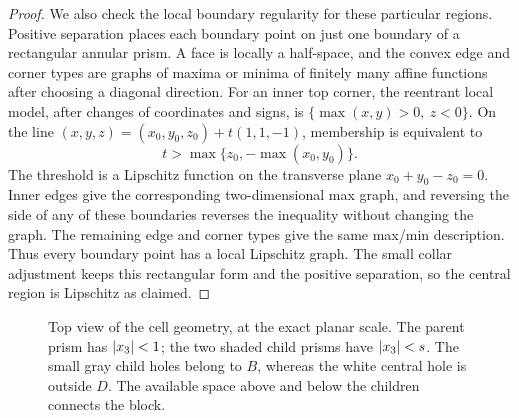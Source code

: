 \begin{proof}
We also check the local boundary regularity for these particular
regions. Positive separation places each boundary point on just one
boundary of a rectangular annular prism. A face is locally a half-space,
and the convex edge and corner types are graphs of maxima or minima of
finitely many affine functions after choosing a diagonal direction.
For an inner top corner, the reentrant local model, after changes of
coordinates and signs, is
\(\{\max(x,y)>0,\ z<0\}\). On the line
\((x,y,z)=(x_0,y_0,z_0)+t(1,1,-1)\), membership is equivalent to
\[
 t>\max\bigl\{z_0,-\max(x_0,y_0)\bigr\}.
\]
The threshold is a Lipschitz function on the transverse plane
\(x_0+y_0-z_0=0\). Inner edges give the corresponding two-dimensional
max graph, and reversing the side of any of these boundaries reverses
the inequality without changing the graph. The remaining edge and
corner types give the same max/min description. Thus every boundary
point has a local Lipschitz graph. The small collar adjustment keeps this
rectangular form and the positive separation, so the central region
is Lipschitz as claimed.
\end{proof}

\begin{figure}[tb]
\centering
{}
\caption{Top view of the cell geometry, at the exact planar scale.
The parent prism has \(\left\lvert x_3\right\rvert<1\); the two shaded child prisms
have \(\left\lvert x_3\right\rvert<s\). The small gray child holes belong to \(B\),
whereas the white central hole is outside \(D\). The available space
above and below the children connects the block.}
\label{nu:geometry-figure}
\end{figure}

